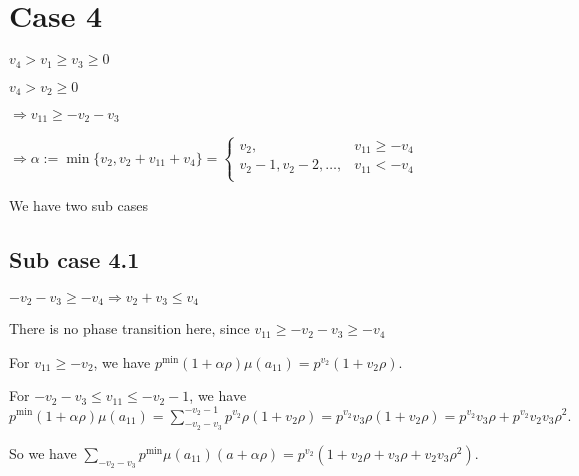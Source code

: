 \documentclass{article}
\begin{document}
\section{Case 4}
$v_4>v_1\geq{v_3}\geq{0}$

$v_4>v_2\geq{0}$

$\Rightarrow{v_{11}}\geq{-v_2-v_3}$

$\Rightarrow\alpha:=\min\{v_2,v_2+v_{11}+v_4\}=\begin{cases}
       v_2, & v_{11}\geq{-v_4}\\
       v_2-1,v_2-2,\dots, & v_{11}<{-v_4}\\
     \end{cases}$

We have two sub cases

\subsection{Sub case 4.1}
$-v_2-v_3\geq{-v_4}\Rightarrow{v_2+v_3\leq{v_4}}$

There is no phase transition here, since $v_{11}\geq{-v_2-v_3}\geq{-v_4}$

For $v_{11}\geq{-v_2}$, we have $p^{\min}(1+\alpha\rho)\mu(a_{11})=p^{v_2}(1+v_2\rho).$

For $-v_2-v_3\leq{v_{11}}\leq{-v_2-1}$, we have $p^{\min}(1+\alpha\rho)\mu(a_{11})=\sum_{-v_2-v_3}^{-v_2-1}p^{v_2}\rho(1+v_2\rho)=p^{v_2}v_3\rho(1+v_2\rho)=p^{v_2}v_3\rho+p^{v_2}v_2v_3\rho^2.$

So we have $\sum_{-v_2-v_3}p^{\min}\mu(a_{11})(a+\alpha\rho)=p^{v_2}(1+v_2\rho+v_3\rho+v_2v_3\rho^2).$
\end{document}
